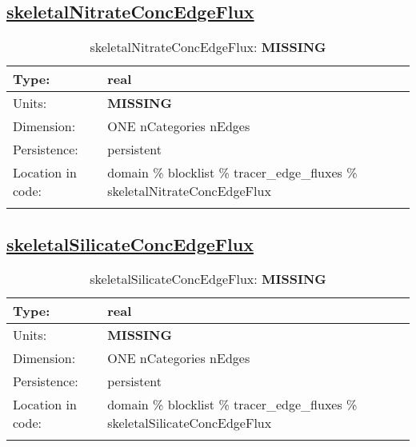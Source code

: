 \subsection[skeletalNitrateConcEdgeFlux]{\hyperref[sec:var_tab_tracer_edge_fluxes]{skeletalNitrateConcEdgeFlux}}
\label{subsec:var_sec_tracer_edge_fluxes_skeletalNitrateConcEdgeFlux}
\begin{center}
\begin{longtable}{| p{2.0in} | p{4.0in} |}
        \hline 
        Type: & real \\
        \hline 
        Units: & {\bf \color{red} MISSING} \\
        \hline 
        Dimension: & ONE nCategories nEdges \\
        \hline 
        Persistence: & persistent \\
        \hline 
         Location in code: & domain \% blocklist \% tracer\_edge\_fluxes \% skeletalNitrateConcEdgeFlux \\
         \hline 
    \caption{skeletalNitrateConcEdgeFlux: {\bf \color{red} MISSING}}
\end{longtable}
\end{center}
\subsection[skeletalSilicateConcEdgeFlux]{\hyperref[sec:var_tab_tracer_edge_fluxes]{skeletalSilicateConcEdgeFlux}}
\label{subsec:var_sec_tracer_edge_fluxes_skeletalSilicateConcEdgeFlux}
\begin{center}
\begin{longtable}{| p{2.0in} | p{4.0in} |}
        \hline 
        Type: & real \\
        \hline 
        Units: & {\bf \color{red} MISSING} \\
        \hline 
        Dimension: & ONE nCategories nEdges \\
        \hline 
        Persistence: & persistent \\
        \hline 
         Location in code: & domain \% blocklist \% tracer\_edge\_fluxes \% skeletalSilicateConcEdgeFlux \\
         \hline 
    \caption{skeletalSilicateConcEdgeFlux: {\bf \color{red} MISSING}}
\end{longtable}
\end{center}
